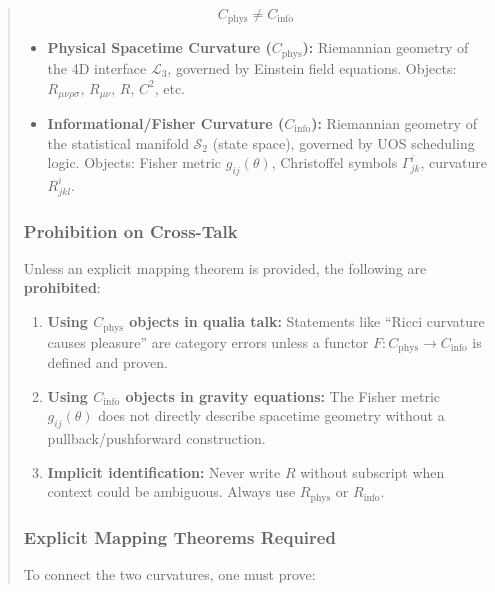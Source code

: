 \documentclass[11pt,titlepage]{article}
\begin{document}
\begin{abstract}
\begin{tcolorbox}[colback=red!5!white,colframe=red!75!black,title=Critical Distinction (Enforced Throughout)]
\[
\boxed{C_{\mathrm{phys}} \neq C_{\mathrm{info}}}
\]

\begin{itemize}
\item \textbf{Physical Spacetime Curvature ($C_{\mathrm{phys}}$):} Riemannian geometry of the 4D interface $\mathcal{L}_3$, governed by Einstein field equations. Objects: $R_{\mu\nu\rho\sigma}$, $R_{\mu\nu}$, $R$, $C^2$, etc.

\item \textbf{Informational/Fisher Curvature ($C_{\mathrm{info}}$):} Riemannian geometry of the statistical manifold $\mathcal{S}_2$ (state space), governed by UOS scheduling logic. Objects: Fisher metric $g_{ij}(\theta)$, Christoffel symbols $\Gamma^i_{jk}$, curvature $R^i_{jkl}$.
\end{itemize}
\end{tcolorbox}

\subsubsection{Prohibition on Cross-Talk}
Unless an explicit mapping theorem is provided, the following are \textbf{prohibited}:

\begin{enumerate}
\item \textbf{Using $C_{\mathrm{phys}}$ objects in qualia talk:} Statements like ``Ricci curvature causes pleasure'' are category errors unless a functor $F: C_{\mathrm{phys}} \to C_{\mathrm{info}}$ is defined and proven.

\item \textbf{Using $C_{\mathrm{info}}$ objects in gravity equations:} The Fisher metric $g_{ij}(\theta)$ does not directly describe spacetime geometry without a pullback/pushforward construction.

\item \textbf{Implicit identification:} Never write $R$ without subscript when context could be ambiguous. Always use $R_{\mathrm{phys}}$ or $R_{\mathrm{info}}$.
\end{enumerate}

\subsubsection{Explicit Mapping Theorems Required}
To connect the two curvatures, one must prove:


\end{abstract}
\end{document}
